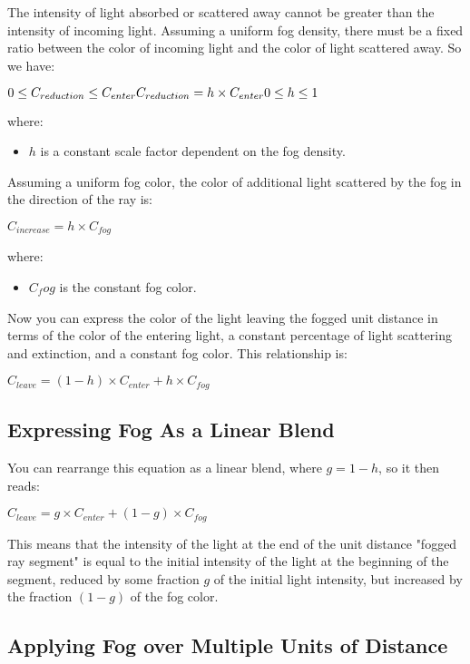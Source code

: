 \documentclass[../main.tex]{subfiles}
\begin{document}
The intensity of light absorbed or scattered away cannot be greater than the intensity of incoming light. Assuming a uniform fog density, there must be a fixed ratio between the color of incoming light and the color of light scattered away. So we have:

\FloatBarrier
$
0\leq C_{reduction}\leq C_{enter} \newline
C_{reduction}=h\times C_{enter} \newline
0\leq h\leq 1
$
\FloatBarrier

where:
\begin{itemize}
\item $h$ is a constant scale factor dependent on the fog density.
\end{itemize}

Assuming a uniform fog color, the color of additional light scattered by the fog in the direction of the ray is:

\FloatBarrier
$
C_{increase}=h\times C_{fog}
$
\FloatBarrier

where:
\begin{itemize}
\item $C_fog$ is the constant fog color.
\end{itemize}

Now you can express the color of the light leaving the fogged unit distance in terms of the color of the entering light, a constant percentage of light scattering and extinction, and a constant fog color. This relationship is:

\FloatBarrier
$
C_{leave}=(1-h)\times C_{enter}+h\times C_{fog}
$
\FloatBarrier

\subsection*{Expressing Fog As a Linear Blend}

You can rearrange this equation as a linear blend, where $g = 1 - h$, so it then reads:

\FloatBarrier
$
C_{leave}=g\times C_{enter}+(1-g)\times C_{fog}
$
\FloatBarrier

This means that the intensity of the light at the end of the unit distance "fogged ray segment" is equal to the initial intensity of the light at the beginning of the segment, reduced by some fraction $g$ of the initial light intensity, but increased by the fraction $(1 - g)$ of the fog color.

\subsection*{Applying Fog over Multiple Units of Distance}
\end{document}
